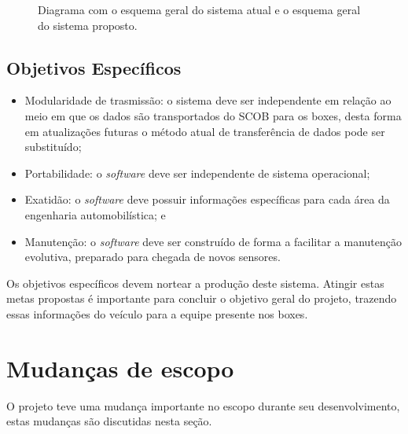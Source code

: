 \begin{figure}[!htb]
	\center
	\caption{Diagrama com o esquema geral do sistema atual e o esquema geral do sistema proposto.}
	\qquad
	\label{fig:esquemageral}
\end{figure}


\subsection{Objetivos Específicos} 

\begin{itemize}[label={-}]
	\item Modularidade de trasmissão: o sistema deve ser independente em relação ao meio em que os dados são transportados do SCOB para os boxes, desta forma em atualizações futuras o método atual de transferência de dados pode ser substituído;
	\item Portabilidade: o \textit{software} deve ser independente de sistema operacional;
	\item Exatidão: o \textit{software} deve possuir informações específicas para cada área da engenharia automobilística; e
	\item Manutenção: o \textit{software} deve ser construído de forma a facilitar a manutenção evolutiva, preparado para chegada de novos sensores.
\end{itemize}

Os objetivos específicos devem nortear a produção deste sistema. Atingir estas metas propostas é importante para concluir o objetivo geral do projeto, trazendo essas informações do veículo para a equipe presente nos boxes.

\section{Mudanças de escopo}
O projeto teve uma mudança importante no escopo durante seu desenvolvimento, estas mudanças são discutidas nesta seção.

